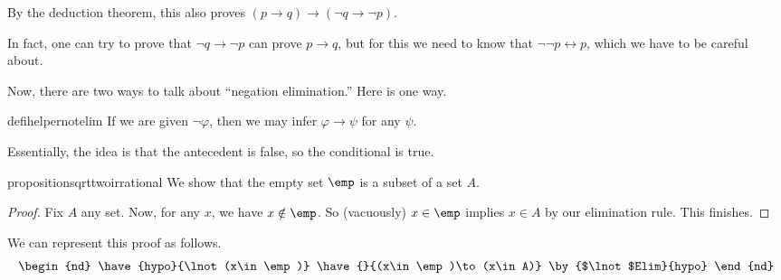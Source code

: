 \begin{remark}
	By the deduction theorem, this also proves $(p\to q)\to(\lnot q\to\lnot p)$.
\end{remark}
In fact, one can try to prove that $\lnot q\to\lnot p$ can prove $p\to q$, but for this we need to know that $\lnot\lnot p\leftrightarrow p$, which we have to be careful about.

Now, there are two ways to talk about ``negation elimination.'' Here is one way.
\begin{restatable}{defihelper}{notelim} 
	If we are given $\lnot\varphi$, then we may infer $\varphi\to\psi$ for any $\psi$.
\end{restatable}
Essentially, the idea is that the antecedent is false, so the conditional is true.
\begin{restatable}{proposition}{sqrttwoirrational}
	We show that the empty set $\emp$ is a subset of a set $A$.
\end{restatable}
\begin{proof}
	Fix $A$ any set. Now, for any $x$, we have $x\notin\emp$. So (vacuously) $x\in\emp$ implies $x\in A$ by our elimination rule. This finishes.
\end{proof}
We can represent this proof as follows.
\begin{align*}
	\begin{nd}
		\have{hypo}{\lnot(x\in\emp)}
		\have{}{(x\in\emp)\to(x\in A)} \by{$\lnot$Elim}{hypo}
	\end{nd}
\end{align*}